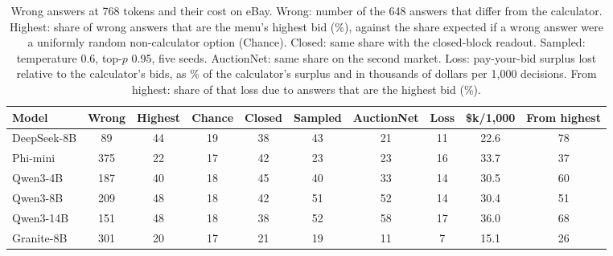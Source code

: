 \begin{table}[t]
\caption{Wrong answers at 768 tokens and their cost on eBay. Wrong: number of the 648 answers that differ from the calculator. Highest: share of wrong answers that are the menu's highest bid (\%), against the share expected if a wrong answer were a uniformly random non-calculator option (Chance). Closed: same share with the closed-block readout. Sampled: temperature 0.6, top-$p$ 0.95, five seeds. AuctionNet: same share on the second market. Loss: pay-your-bid surplus lost relative to the calculator's bids, as \% of the calculator's surplus and in thousands of dollars per 1,000 decisions. From highest: share of that loss due to answers that are the highest bid (\%).}
\label{tab:wrong}
\footnotesize
\centering

\begin{tabular}{lccccccccc}
\toprule
Model & Wrong & Highest & Chance & Closed & Sampled & AuctionNet & Loss & \$k/1{,}000 & From highest \\
\midrule
DeepSeek-8B & 89 & 44 & 19 & 38 & 43 & 21 & 11 & 22.6 & 78 \\
Phi-mini & 375 & 22 & 17 & 42 & 23 & 23 & 16 & 33.7 & 37 \\
Qwen3-4B & 187 & 40 & 18 & 45 & 40 & 33 & 14 & 30.5 & 60 \\
Qwen3-8B & 209 & 48 & 18 & 42 & 51 & 52 & 14 & 30.4 & 51 \\
Qwen3-14B & 151 & 48 & 18 & 38 & 52 & 58 & 17 & 36.0 & 68 \\
Granite-8B & 301 & 20 & 17 & 21 & 19 & 11 & 7 & 15.1 & 26 \\
\bottomrule
\end{tabular}
\end{table}
